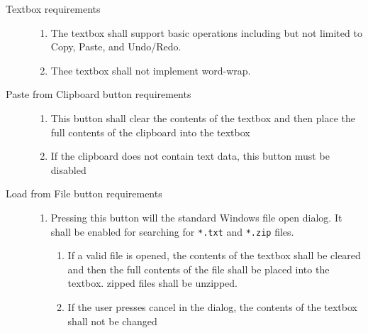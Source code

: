 \begin{description}
\item[Textbox requirements] \hfill
\begin{enumerate}
\item The textbox shall support basic operations including but not limited to
Copy, Paste, and Undo/Redo.
\item Thee textbox shall not implement word-wrap.	  
\end{enumerate}

\item[Paste from Clipboard button requirements] \hfill
\begin{enumerate}
\item This button shall clear the contents of the textbox and then place
the full contents of the clipboard into the textbox
\item If the clipboard does not contain text data, this button must be
disabled
\end{enumerate}

\item[Load from File button requirements] \hfill
\begin{enumerate}
\item Pressing this button will the standard Windows file open dialog.  It
shall be enabled for searching for \texttt{*.txt} and \texttt{*.zip} files.
\begin{enumerate}
\item  If a valid file is opened, the contents of the textbox shall be cleared
and then the full contents of the file shall be placed into the textbox.
zipped files shall be unzipped.
\item If the user presses cancel in the dialog, the contents of the textbox
shall not be changed
\end{enumerate}
\end{enumerate}


\end{description}
